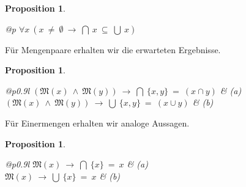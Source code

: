\documentclass[a4paper,german,10pt,twoside]{book}
\newtheorem{prop}[thm]{Proposition}
\theoremstyle{definition}
\theoremstyle{remark}
\begin{document}
\begin{prop}
\label{theorem:nonEmptySumProductSubSet} \hypertarget{theorem:nonEmptySumProductSubSet}{}
\mbox{}
\begin{longtable}{{@{\extracolsep{\fill}}p{\linewidth}}}
\centering $\forall x\ (x \ \neq \ \emptyset\ \rightarrow \ \bigcap \ x \ \subseteq \ \bigcup \ x)$
\end{longtable}

\end{prop}




\par
F{\"u}r Mengenpaare erhalten wir die erwarteten Ergebnisse.

\begin{prop}
\label{theorem:setPairSetSumProduct} \hypertarget{theorem:setPairSetSumProduct}{}
\mbox{}
\begin{longtable}{{@{\extracolsep{\fill}}p{0.9\linewidth}l}}
\centering $(\mathfrak{M}(x)\ \land \ \mathfrak{M}(y))\ \rightarrow \ \bigcap \ \{ x, y \} \ =  \ (x \cap y)$ & \label{theorem:setPairSetSumProduct:a} \hypertarget{theorem:setPairSetSumProduct:a}{} \mbox{\emph{(a)}} \\
\centering $(\mathfrak{M}(x)\ \land \ \mathfrak{M}(y))\ \rightarrow \ \bigcup \ \{ x, y \} \ =  \ (x \cup y)$ & \label{theorem:setPairSetSumProduct:b} \hypertarget{theorem:setPairSetSumProduct:b}{} \mbox{\emph{(b)}} 
\end{longtable}

\end{prop}




\par
F{\"u}r Einermengen erhalten wir analoge Aussagen.

\begin{prop}
\label{theorem:singletonSetSumProduct} \hypertarget{theorem:singletonSetSumProduct}{}
\mbox{}
\begin{longtable}{{@{\extracolsep{\fill}}p{0.9\linewidth}l}}
\centering $\mathfrak{M}(x)\ \rightarrow \ \bigcap \ \{ x \} \ =  \ x$ & \label{theorem:singletonSetSumProduct:a} \hypertarget{theorem:singletonSetSumProduct:a}{} \mbox{\emph{(a)}} \\
\centering $\mathfrak{M}(x)\ \rightarrow \ \bigcup \ \{ x \} \ =  \ x$ & \label{theorem:singletonSetSumProduct:b} \hypertarget{theorem:singletonSetSumProduct:b}{} \mbox{\emph{(b)}} 
\end{longtable}

\end{prop}
\end{document}
